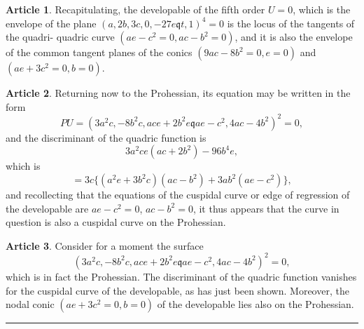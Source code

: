 \documentclass[11pt,a4paper]{article}
\theoremstyle{definition}
\newtheorem{art}{Article}[section]
\begin{document}
\begin{art}
Recapitulating, the developable of the fifth order $U = 0$, which is the envelope
of the plane $(a, 2b, 3c, 0, -27e \mathbin{\mathfrak{q}} t, 1)^4 = 0$ is the locus of the tangents of the quadri-
quadric curve $(ae - c^2 = 0, ac - b^2 = 0)$, and it is also the envelope of the common tangent
planes of the conics $(9ac - 8b^2 = 0, e = 0)$ and $(ae + 3c^2 = 0, b = 0)$.
\end{art}

\begin{art}
Returning now to the Prohessian, its equation may be written in the form
\[
PU = (3a^2c, -8b^2c, ace + 2b^2e \mathbin{\mathfrak{q}} ae - c^2, 4ac - 4b^2)^2 = 0,
\]
and the discriminant of the quadric function is
\[
3a^2ce(ac + 2b^2) - 96b^4e,
\]
which is
\[
= 3c\{(a^2e + 3b^2c)(ac - b^2) + 3ab^2(ae - c^2)\},
\]
and recollecting that the equations of the cuspidal curve or edge of regression of the
developable are $ae - c^2 = 0$, $ac - b^2 = 0$, it thus appears that the curve in question is also
a cuspidal curve on the Prohessian.
\end{art}

\begin{art}
Consider for a moment the surface
\[
(3a^2c, -8b^2c, ace + 2b^2e \mathbin{\mathfrak{q}} ae - c^2, 4ac - 4b^2)^2 = 0,
\]
which is in fact the Prohessian. The discriminant of the quadric function
vanishes for the cuspidal curve of the developable, as has just been shown. Moreover,
the nodal conic $(ae + 3c^2 = 0, b = 0)$ of the developable lies also on the Prohessian.
\end{art}

\vspace{1cm}
\begin{center}
\rule{0.5\textwidth}{0.4pt}
\end{center}
\end{document}
